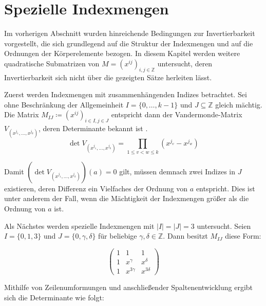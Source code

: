 \section{Spezielle Indexmengen} \label{sec:spezielleIndexmengen}

Im vorherigen Abschnitt wurden hinreichende Bedingungen zur Invertierbarkeit vorgestellt, die sich grundlegend auf die Struktur der Indexmengen und auf die Ordnungen der Körperelemente bezogen. In diesem Kapitel werden weitere quadratische Submatrizen von $M = \left( x^{ij} \right)_{i,j \in \mathbb{Z}}$ untersucht, deren Invertierbarkeit sich nicht über die gezeigten Sätze herleiten lässt.

Zuerst werden Indexmengen mit zusammenhängenden Indizes betrachtet. Sei ohne Beschränkung der Allgemeinheit $I = \{0,\dots,k-1\}$ und $J \subseteq \mathbb{Z}$ gleich mächtig. Die Matrix $M_{IJ} \coloneqq \left( x^{ij} \right)_{i \in I,j \in J}$ entspricht dann der Vandermonde-Matrix $V_{(x^{j_1},\dots,x^{j_k})}$, deren Determinante bekannt ist \cite{VandermondeDet}.
\begin{equation*}
    \det V_{(x^{j_1},\dots,x^{j_k})} = \prod_{1\leq v<w\leq k} (x^{j_v} - x^{j_w})
\end{equation*}

Damit $(\det V_{(x^{j_1},\dots,x^{j_k})})(a) = 0$ gilt, müssen demnach zwei Indizes in $J$ existieren, deren Differenz ein Vielfaches der Ordnung von $a$ entspricht. Dies ist unter anderem der Fall, wenn die Mächtigkeit der Indexmengen größer als die Ordnung von $a$ ist.

\begin{sloppypar}
    Als Nächstes werden spezielle Indexmengen mit $|I| = |J| = 3$ untersucht. Seien ${I = \{0, 1, 3\}}$ und $J = \{0, \gamma, \delta\}$ für beliebige $\gamma,\delta \in \mathbb{Z}$. Dann besitzt $M_{IJ}$ diese Form:
\end{sloppypar}
\begin{equation*}
    \begin{pmatrix}
        1 & 1 & 1 \\
        1 & x^{\gamma} & x^{\delta} \\
        1 & x^{3\gamma} & x^{3\delta}
    \end{pmatrix}
\end{equation*}

Mithilfe von Zeilenumformungen und anschließender Spaltenentwicklung ergibt sich die Determinante wie folgt:

